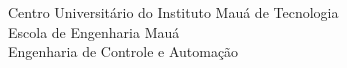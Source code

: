   \begin{capa}%
    \center
	\ABNTEXchapterfont\large{Centro Universitário do Instituto Mauá de Tecnologia \\Escola de Engenharia Mauá\\Engenharia de Controle e Automação}

    \vfill
    \ABNTEXchapterfont\bfseries\LARGE\imprimirtitulo
    \vfill

	\ABNTEXchapterfont\large\imprimirautor
	\vfill
%
    \large\imprimirlocal \\
    \large\imprimirdata

    \vspace*{1cm}
  \end{capa}
